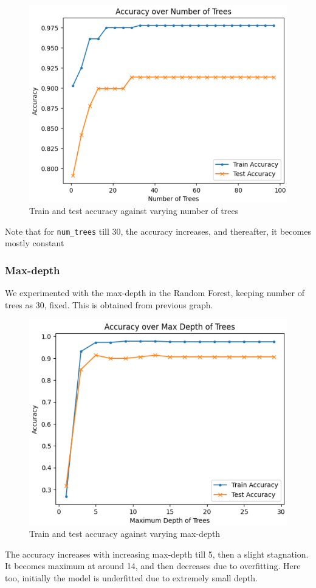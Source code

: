 \begin{figure}[htbp]
    \centering
    \includegraphics[width=0.6\linewidth]{images/gbdt_acc_num_trees2.png}
    \caption*{Train and test accuracy against varying number of trees}
    \label{fig:your_label}
\end{figure}

Note that for \texttt{num\_trees} till 30, the accuracy increases, and thereafter, it becomes mostly constant

\subsubsection{Max-depth}
We experimented with the  max-depth in the Random Forest, keeping number of trees as 30, fixed. This is obtained from previous graph.\\
\begin{figure}[htbp]
    \centering
    \includegraphics[width=0.8\linewidth]{images/gbdt_acc_max_depth.png}
    \caption*{Train and test accuracy against varying max-depth}
    \label{fig:your_label}
\end{figure}
\newline
The accuracy increases with increasing max-depth till 5, then a slight stagnation.
It becomes maximum at around 14, and then decreases due to overfitting. Here too, initially the model is underfitted due to extremely small depth.\\


